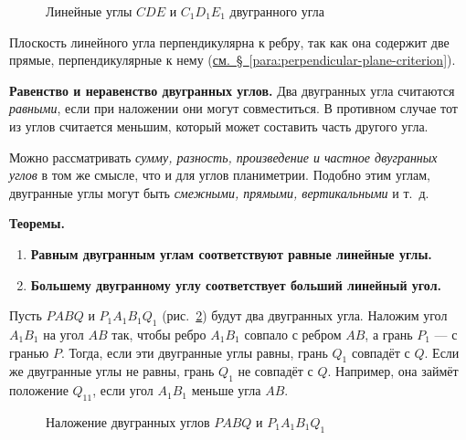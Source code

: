 \begin{figure}[htbp]
    \centering
    \renewcommand{\thefigure}{333}
    \captionsetup{name=Рис.,labelsep=period}
    
    \caption{Линейные углы \(CDE\) и \(C_1D_1E_1\) двугранного угла}\label{fig:kiselev-stereo-333}
\end{figure}

Плоскость линейного угла перпендикулярна к ребру, так как она содержит две прямые, перпендикулярные к нему (\hyperref[para:perpendicular-plane-criterion]{см.~§~\ref*{para:perpendicular-plane-criterion}}).

 \textbf{Равенство и неравенство двугранных углов.} Два двугранных угла считаются \emph{равными}, если при наложении они могут совместиться. В противном случае тот из углов считается меньшим, который может составить часть другого угла.

Можно рассматривать \emph{сумму, разность, произведение и частное двугранных углов} в том же смысле, что и для углов планиметрии. Подобно этим углам, двугранные углы могут быть \emph{смежными, прямыми, вертикальными} и т.~д.

 \textbf{Теоремы.}

\begin{enumerate}[label=\arabic*),ref=\arabic*]
    \item \textbf{Равным двугранным углам соответствуют равные линейные углы.}
    \item \textbf{Большему двугранному углу соответствует больший линейный угол.}
\end{enumerate}

Пусть \(PABQ\) и \(P_1A_1B_1Q_1\) (рис.~\ref{fig:kiselev-stereo-334}) будут два двугранных угла. Наложим угол \(A_1B_1\) на угол \(AB\) так, чтобы ребро \(A_1B_1\) совпало с ребром \(AB\), а грань \(P_1\) --- с гранью \(P\). Тогда, если эти двугранные углы равны, грань \(Q_1\) совпадёт с \(Q\). Если же двугранные углы не равны, грань \(Q_1\) не совпадёт с \(Q\). Например, она займёт положение \(Q_{11}\), если угол \(A_1B_1\) меньше угла \(AB\).

\begin{figure}[htbp]
    \centering
    \renewcommand{\thefigure}{334}
    \captionsetup{name=Рис.,labelsep=period}
    
    \caption{Наложение двугранных углов \(PABQ\) и \(P_1A_1B_1Q_1\)}\label{fig:kiselev-stereo-334}
\end{figure}

